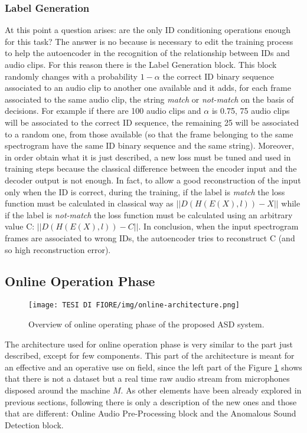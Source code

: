 \subsubsection{Label Generation}
At this point a question arises: are the only ID conditioning operations enough for this task? The answer is no because is necessary to edit the training process to help the autoencoder in the recognition of the relationship between IDs and audio clips. For this reason there is the Label Generation block. This block randomly changes with a probability $1-\alpha$ the correct ID binary sequence associated to an audio clip to another one available and it adds, for each frame associated to the same audio clip, the string \textit{match} or \textit{not-match} on the basis of decisions. For example if there are 100 audio clips and $\alpha$ is 0.75, 75 audio clips will be associated to the correct ID sequence, the remaining 25 will be associated to a random one, from those available (so that the frame belonging to the same spectrogram have the same ID binary sequence and the same string). Moreover, in order obtain what it is just described, a new loss must be tuned and used in training steps because the classical difference between the encoder input and the decoder output is not enough. In fact, to allow a good reconstruction of the input only when the ID is correct, during the training, if the label is \textit{match} the loss function must be calculated in classical way as $||D(H(E(X),l)) - X||$
while if the label is \textit{not-match} the loss function must be calculated using an arbitrary value C: $||D(H(E(X),l)) - C||$.
In conclusion, when the input spectrogram frames are associated to wrong IDs, the autoencoder tries to reconstruct C (and so high reconstruction error).
\subsection{Online Operation Phase}
\begin{figure}[ht]
\texttt{[image: TESI DI FIORE/img/online-architecture.png]}
\centering
\caption{Overview of online operating phase of the proposed ASD system.}
\label{online-asd-system}
\end{figure}
The architecture used for online operation phase is very similar to the part just described, except for few components. This part of the architecture is meant for an effective and an operative use on field, since the left part of the Figure \ref{online-asd-system} shows that there is not a dataset but a real time raw audio stream from microphones disposed around the machine $M$. As other elements have been already explored in previous sections, following  there is only a description of the new ones and those that are different: Online Audio Pre-Processing block and the Anomalous Sound Detection block. 
